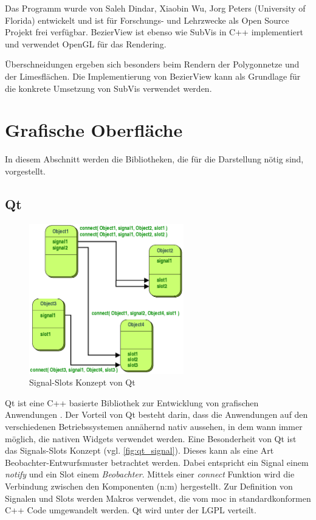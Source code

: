 Das Programm wurde von Saleh Dindar, Xiaobin Wu, Jorg Peters (University of Florida) entwickelt und ist für Forschungs- und Lehrzwecke als Open Source Projekt frei verfügbar. BezierView ist ebenso wie SubVis in C++ implementiert und verwendet OpenGL für das Rendering.

Überschneidungen ergeben sich besonders beim Rendern der Polygonnetze und der Limesflächen. Die Implementierung von BezierView kann als Grundlage für die konkrete Umsetzung von SubVis verwendet werden.


\section{Grafische Oberfläche}

In diesem Abschnitt werden die Bibliotheken, die für die Darstellung nötig sind, vorgestellt.

\subsection{Qt} %

\begin{figure}[hp]
  \centering
  \includegraphics[width=0.6\textwidth]{content/media/qt_signal}
  \caption{Signal-Slots Konzept von Qt \cite{Qt}}
  \label{fig:qt_signal}
\end{figure}

Qt ist eine C++ basierte Bibliothek zur Entwicklung von grafischen Anwendungen \cite{Qt}. 
Der Vorteil von Qt besteht darin, dass die Anwendungen auf den verschiedenen Betriebssystemen annähernd nativ aussehen, in dem wann immer möglich, die nativen Widgets verwendet werden.
Eine Besonderheit von Qt ist das Signals-Slots Konzept (vgl. \autoref{fig:qt_signal}). 
Dieses kann als eine Art Beobachter-Entwurfsmuster betrachtet werden.
Dabei entspricht ein Signal einem \emph{notify} und ein Slot einem \emph{Beobachter}. 
Mittels einer \emph{connect} Funktion wird die Verbindung zwischen den Komponenten (n:m) hergestellt.
Zur Definition von Signalen und Slots werden Makros verwendet, die vom \ac{moc} in standardkonformen C++ Code umgewandelt werden.
Qt wird unter der \ac{LGPL} verteilt.

